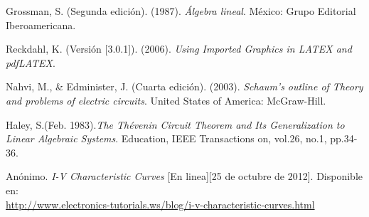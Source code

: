 \documentclass[osajnl,twocolumn,showpacs,superscriptaddress,10pt]{revtex4-1}
\begin{document}
\begin{thebibliography}{99}

\bibitem{} Grossman, S. (Segunda edición). (1987). \textit{Álgebra lineal}. México: Grupo Editorial Iberoamericana.

\bibitem{} Reckdahl, K. (Versión [3.0.1]). (2006).\textit{ Using Imported Graphics in LATEX and pdfLATEX}.

\bibitem{}Nahvi, M., \& Edminister, J. (Cuarta edición). (2003). \textit{Schaum's outline of Theory and problems of electric circuits}. United States of America: McGraw-Hill.

\bibitem{} Haley, S.(Feb. 1983).\textit{The Thévenin Circuit Theorem and Its Generalization to Linear Algebraic Systems}. Education, IEEE Transactions on, vol.26, no.1, pp.34-36.

\bibitem{}Anónimo.\textit{ I-V Characteristic Curves} [En linea][25 de octubre de 2012]. Disponible en:\\ \url{http://www.electronics-tutorials.ws/blog/i-v-characteristic-curves.html}
\end{thebibliography}
\end{document}
